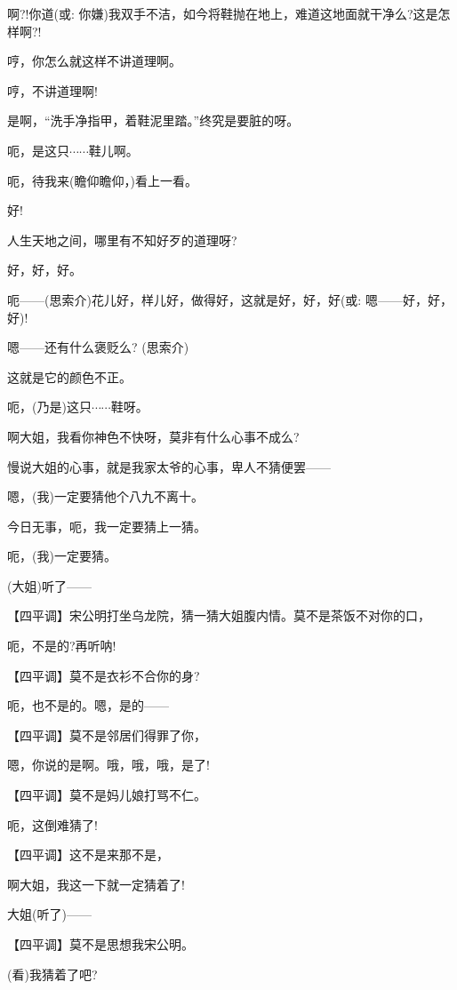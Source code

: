 {啊?!你道({\akai 或}: 你嫌)我双手不洁，如今将鞋抛在地上，难道这地面就干净么?这是怎样啊?!}

{哼，你怎么就这样不讲道理啊。}

{哼，不讲道理啊!}

{是啊，``洗手净指甲，着鞋泥里踏。''终究是要脏的呀。}

{呃，是这只$\cdots{}\cdots{}$鞋儿啊。}

{呃，待我来(瞻仰瞻仰，)看上一看。}

{好!}

{人生天地之间，哪里有不知好歹的道理呀?}

{好，好，好。}

{呃------(思索介)花儿好，样儿好，做得好，这就是好，好，好({\akai 或}: 嗯------好，好，好)!}

{嗯------还有什么褒贬么? (思索介)}

{这就是它的颜色不正。}

{呃，(乃是)这只$\cdots{}\cdots{}$鞋呀。}

{啊大姐，我看你神色不快呀，莫非有什么心事不成么?}

{慢说大姐的心事，就是我家太爷的心事，卑人不猜便罢------}

{嗯，(我)一定要猜他个八九不离十。}

{今日无事，呃，我一定要猜上一猜。}

{呃，(我)一定要猜。}

{(大姐)听了------}

\setlength{\hangindent}{60pt} {【四平调】宋公明打坐乌龙院，猜一猜大姐腹内情。莫不是茶饭不对你的口，}

{呃，不是的?再听呐!}

\setlength{\hangindent}{60pt} {【四平调】莫不是衣衫不合你的身?}

{呃，也不是的。嗯，是的------}

\setlength{\hangindent}{60pt} {【四平调】莫不是邻居们得罪了你，}

{嗯，你说的是啊。哦，哦，哦，是了!}

\setlength{\hangindent}{60pt} {【四平调】莫不是妈儿娘打骂不仁。}

{呃，这倒难猜了!}

\setlength{\hangindent}{60pt} {【四平调】这不是来那不是，}

{啊大姐，我这一下就一定猜着了!}

{大姐(听了)------}

\setlength{\hangindent}{60pt} {【四平调】莫不是思想我宋公明。}

{(看)我猜着了吧?}

